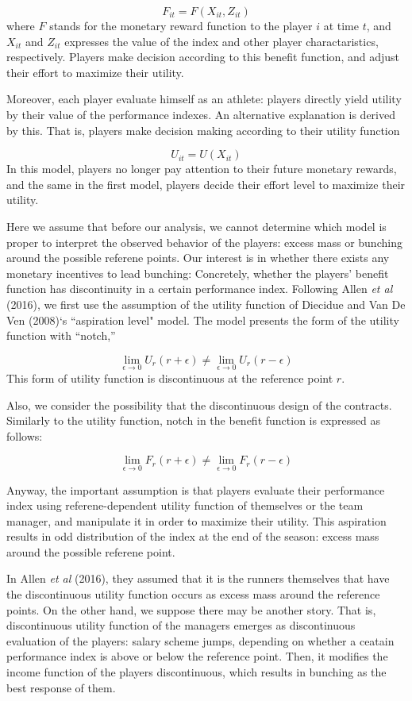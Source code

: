 \documentclass[dvipdfmx, 12pt]{article}
\begin{document}
\[
F_{it} = F(X_{it}, Z_{it})
\]
where $F$ stands for the monetary reward function to the player $i$ at time $t$, and $X_{it}$ and $Z_{it}$ expresses the value of the index and other player charactaristics, respectively. Players make decision according to this benefit function, and adjust their effort to maximize their utility.

Moreover, each player evaluate himself as an athlete: players directly yield utility by their value of the performance indexes. An alternative explanation is derived by this. That is, players make decision making according to their utility function

\[
U_{it} = U(X_{it})
\]
In this model, players no longer pay attention to their future monetary rewards, and the same in the first model, players decide their effort level to maximize their utility.

Here we assume that before our analysis, we cannot determine which model is proper to interpret the observed behavior of the players: excess mass or bunching around the possible referene points. Our interest is in whether there exists any monetary incentives to lead bunching: Concretely, whether the players' benefit function has discontinuity in a certain performance index. Following Allen \textit{et al} (2016), we first use the assumption of the utility function of Diecidue and Van De Ven (2008)`s ``aspiration level" model. The model presents the form of the utility function with ``notch,''

\[
\lim_{\epsilon \to 0} U_r (r + \epsilon) \neq
\lim_{\epsilon \to 0} U_r (r - \epsilon)
\]
This form of utility function is discontinuous at the reference point $r$.

Also, we consider the possibility that the discontinuous design of the contracts. Similarly to the utility function, notch in the benefit function is expressed as follows:

\[
\lim_{\epsilon \to 0} F_r (r + \epsilon) \neq
\lim_{\epsilon \to 0} F_r (r - \epsilon)
\]

Anyway, the important assumption is that players evaluate their performance index using referene-dependent utility function of themselves or the team manager, and manipulate it in order to maximize their utility. This aspiration results in odd distribution of the index at the end of the season: excess mass around the possible referene point.

In Allen \textit{et al} (2016), they assumed that it is the runners  themselves that have the discontinuous utility function occurs as excess mass around the reference points. On the other hand, we suppose there may be another story. That is, discontinuous utility function of the managers emerges as discontinuous evaluation of the players: salary scheme jumps, depending on whether a ceatain performance index is above or below the reference point. Then, it modifies the income function of the players discontinuous, which results in bunching as the best response of them.
\end{document}
